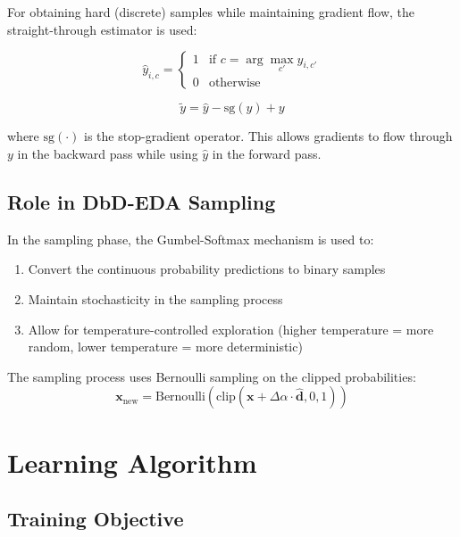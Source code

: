 \documentclass[11pt,a4paper]{article}
\newcommand{\vx}{\mathbf{x}}
\begin{document}
For obtaining hard (discrete) samples while maintaining gradient flow, the straight-through estimator is used:

\begin{equation}
    \hat{y}_{i,c} = \begin{cases}
        1 & \text{if } c = \arg\max_{c'} y_{i,c'} \\
        0 & \text{otherwise}
    \end{cases}
\end{equation}

\begin{equation}
    \tilde{y} = \hat{y} - \text{sg}(y) + y
\end{equation}

where $\text{sg}(\cdot)$ is the stop-gradient operator. This allows gradients to flow through $y$ in the backward pass while using $\hat{y}$ in the forward pass.

\subsection{Role in DbD-EDA Sampling}

In the sampling phase, the Gumbel-Softmax mechanism is used to:
\begin{enumerate}
    \item Convert the continuous probability predictions to binary samples
    \item Maintain stochasticity in the sampling process
    \item Allow for temperature-controlled exploration (higher temperature = more random, lower temperature = more deterministic)
\end{enumerate}

The sampling process uses Bernoulli sampling on the clipped probabilities:
\begin{equation}
    \vx_{\text{new}} = \text{Bernoulli}\left(\text{clip}(\vx + \Delta\alpha \cdot \hat{\mathbf{d}}, 0, 1)\right)
\end{equation}

\section{Learning Algorithm}

\subsection{Training Objective}
\end{document}
